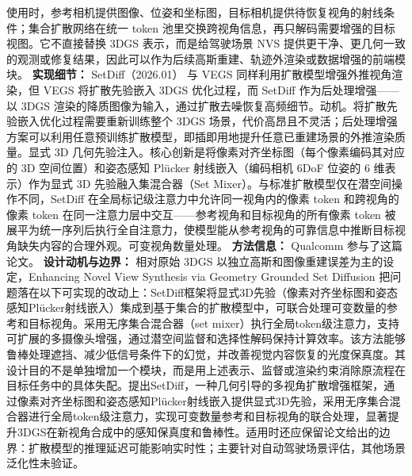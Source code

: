 使用时，参考相机提供图像、位姿和坐标图，目标相机提供待恢复视角的射线条件；集合扩散网络在统一 token 池里交换跨视角信息，再只解码需要增强的目标视图。它不直接替换 3DGS 表示，而是给驾驶场景 NVS 提供更干净、更几何一致的观测或修复结果，因此可以作为后续高斯重建、轨迹外渲染或数据增强的前端模块。
\textbf{实现细节：} SetDiff（2026.01） 与 VEGS 同样利用扩散模型增强外推视角渲染，但 VEGS 将扩散先验嵌入 3DGS 优化过程，而 SetDiff 作为后处理增强——以 3DGS 渲染的降质图像为输入，通过扩散去噪恢复高频细节。动机。将扩散先验嵌入优化过程需要重新训练整个 3DGS 场景，代价高昂且不灵活；后处理增强方案可以利用任意预训练扩散模型，即插即用地提升任意已重建场景的外推渲染质量。显式 3D 几何先验注入。核心创新是将像素对齐坐标图（每个像素编码其对应的 3D 空间位置）和姿态感知 Pl\"ucker 射线嵌入（编码相机 6DoF 位姿的 6 维表示）作为显式 3D 先验融入集混合器（Set Mixer）。与标准扩散模型仅在潜空间操作不同，SetDiff 在全局标记级注意力中允许同一视角内的像素 token 和跨视角的像素 token 在同一注意力层中交互——参考视角和目标视角的所有像素 token 被展平为统一序列后执行全自注意力，使模型能从参考视角的可靠信息中推断目标视角缺失内容的合理外观。可变视角数量处理。
\textbf{方法信息：} Qualcomm 参与了这篇论文。
\textbf{设计动机与边界：} 相对原始 3DGS 以独立高斯和图像重建误差为主的设定，Enhancing Novel View Synthesis via Geometry Grounded Set Diffusion 把问题落在以下可实现的改动上：SetDiff框架将显式3D先验（像素对齐坐标图和姿态感知Plücker射线嵌入）集成到基于集合的扩散模型中，可联合处理可变数量的参考和目标视角。采用无序集合混合器（set mixer）执行全局token级注意力，支持可扩展的多摄像头增强，通过潜空间监督和选择性解码保持计算效率。该方法能够鲁棒处理遮挡、减少低信号条件下的幻觉，并改善视觉内容恢复的光度保真度。其设计目的不是单独增加一个模块，而是用上述表示、监督或渲染约束消除原流程在目标任务中的具体失配。提出SetDiff，一种几何引导的多视角扩散增强框架，通过像素对齐坐标图和姿态感知Plücker射线嵌入提供显式3D先验，采用无序集合混合器进行全局token级注意力，实现可变数量参考和目标视角的联合处理，显著提升3DGS在新视角合成中的感知保真度和鲁棒性。适用时还应保留论文给出的边界：扩散模型的推理延迟可能影响实时性；主要针对自动驾驶场景评估，其他场景泛化性未验证。
